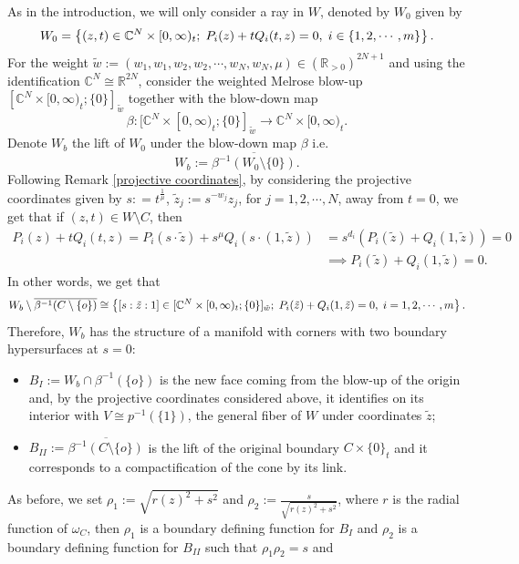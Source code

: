 \documentclass[a4paper,11pt]{article}
\def\C{\mathbb{C}}
\def\R{\mathbb{R}}
\begin{document}
As in the introduction, we will only consider a ray in $W$, denoted by $W_0$ given by 
$$
W_0 = \left\{ (z,t) \in \C^N \times [0, \infty)_t ; \hspace{0.1cm} P_i(z) + t Q_i(t, z) =0, \hspace{0.1cm} i \in \{ 1,2, \cdots, m\} \right\}.
$$
For the weight $\tilde w := \left(w_1, w_1, w_2, w_2, \cdots, w_N, w_N, \mu \right) \in \left( \R_{>0} \right)^{2N+1}$ and using the identification $\C^N \cong \R^{2N}$, consider the weighted Melrose blow-up $\left[\C^N \times [0, \infty)_t ; \{ 0\} \right]_{\tilde w}$ together with the blow-down map 
$$\beta : [\C^N \times [0,\infty)_t ; \{0\}]_{\tilde w} \rightarrow \C^N \times [0,\infty)_t.$$
Denote $W_b$ the lift of $W_0$ under the blow-down map $\beta$ i.e. 
$$
W_b := \overline{\beta^{-1}\left(W_0 \setminus \{ 0\} \right)}. 
$$
Following Remark \ref{projective coordinates}, by considering the projective coordinates given by $s: =t^{\frac{1}{\mu}}$, $\tilde z_j := s^{- w_j} z_j$, for $j =1,2, \cdots, N$, away from $t=0$, we get that if $(z, t) \in W \setminus C$, then
\begin{align*}
P_i(z) + t Q_i(t, z) = P_i(s \cdot \tilde z) + s^\mu Q_i(s \cdot (1, \tilde z)) & = s^{d_i} \left( P_i(\tilde z) +  Q_i(1, \tilde z) \right) = 0 \\ & \implies P_i(\tilde z) +  Q_i(1, \tilde z) =0.
\end{align*} 
In other words, we get that 
$$W_b \setminus \overline{\beta^{-1}(C \setminus \{ o\}) } \cong \left\{[s : \tilde z : 1] \in [\C^N \times [0,\infty)_t ; \{0\}]_{\tilde w} ; \hspace{0.1cm} P_i(\tilde z) +  Q_i(1, \tilde z) =0, \hspace{0.1cm} i =1,2, \cdots, m \right\}.$$
Therefore, $W_b$ has the structure of a manifold with corners with two boundary hypersurfaces at $s=0$: 
\begin{itemize}
    \item 
$B_I:= W_b \cap \beta^{-1} ( \{ o\})$ is the new face coming from the blow-up of the origin and, by the projective coordinates considered above, it identifies on its interior with $V \cong p^{-1}(\{ 1\})$, the general fiber of $W$ under coordinates $\tilde z$;
\item $B_{II} := \overline{\beta^{-1}(C \setminus \{ o\}) }$ is the lift of the original boundary $C \times \{ 0\}_t$ and it corresponds to a compactification of the cone by its link.    
\end{itemize}
As before, we set $\rho_1 := \sqrt{r(z)^2 + s^2}$ and $\rho_2 := \frac{s}{\sqrt{r(z)^2 + s^2}}$, where $r$ is the radial function of $\omega_C$, then $\rho_1$ is a boundary defining function for $B_I$ and $\rho_2$ is a boundary defining function for $B_{II}$ such that $\rho_1 \rho_2 = s$ and 
\end{document}
